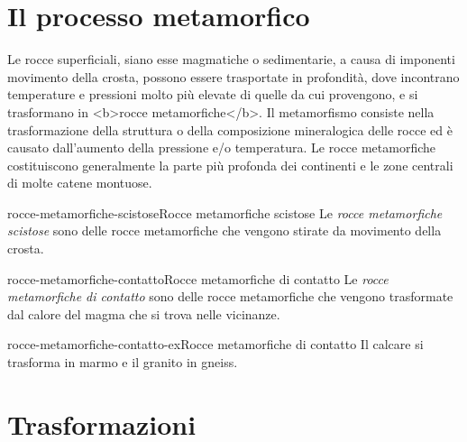 \documentclass[preview]{standalone}
\begin{document}
\section{Il processo metamorfico}

\begin{plainhtml}
    Le rocce superficiali, siano esse magmatiche o sedimentarie, a causa di imponenti
    movimento della crosta, possono essere trasportate in profondità, dove incontrano
    temperature e pressioni molto più elevate di quelle da cui provengono, e si
    trasformano in <b>rocce metamorfiche</b>.
    Il metamorfismo consiste nella trasformazione della struttura
    o della composizione mineralogica delle rocce ed è causato dall'aumento della pressione e/o temperatura.
    Le rocce metamorfiche costituiscono generalmente la parte più profonda dei continenti e le zone centrali
    di molte catene montuose.
\end{plainhtml}

\begin{snippetdefinition}{rocce-metamorfiche-scistose}{Rocce metamorfiche scistose}
    Le \textit{rocce metamorfiche scistose} sono delle rocce metamorfiche
    che vengono stirate da movimento della crosta.
\end{snippetdefinition}

\begin{snippetdefinition}{rocce-metamorfiche-contatto}{Rocce metamorfiche di contatto}
    Le \textit{rocce metamorfiche di contatto} sono delle rocce metamorfiche
    che vengono trasformate dal calore del magma che si trova nelle vicinanze.
\end{snippetdefinition}

\begin{snippetexample}{rocce-metamorfiche-contatto-ex}{Rocce metamorfiche di contatto}
    Il calcare si trasforma in marmo e il granito in gneiss.
\end{snippetexample}

\section{Trasformazioni}


\end{document}
